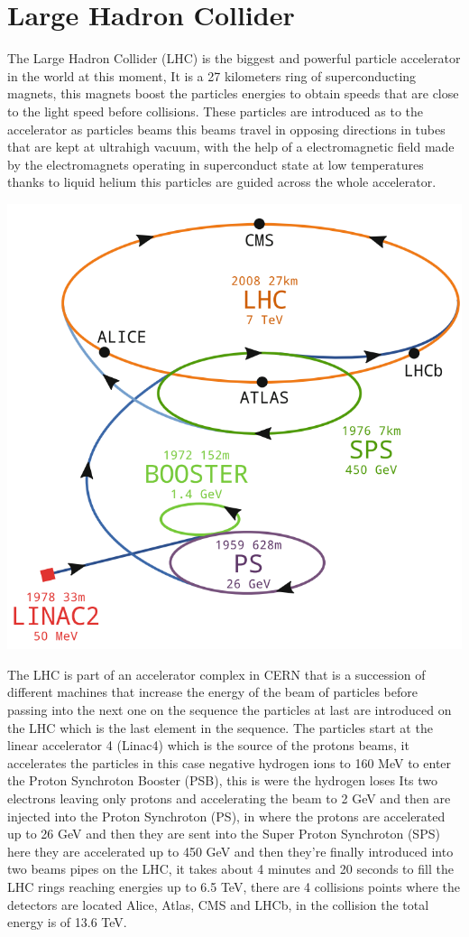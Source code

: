 \section{Large Hadron Collider}

The Large Hadron Collider (LHC) is the biggest and powerful particle accelerator in the world at this moment, It is a 27 kilometers ring of superconducting magnets, this magnets boost the particles energies to obtain speeds that are close to the light speed before collisions. These particles are introduced as to the accelerator as particles beams this beams travel in opposing directions in tubes that are kept at ultrahigh vacuum, with the help of a electromagnetic field made by the electromagnets operating in superconduct state at low temperatures thanks to liquid helium this particles are guided across the whole accelerator. \cite{LHC}


 \includegraphics[scale=0.35]{LHC.png}

The LHC is part of an accelerator complex in CERN that is a succession of different machines that increase the energy of the beam of particles before passing into the next one on the sequence the particles at last are introduced on the LHC which is the last element in the sequence. The particles start at the linear accelerator 4 (Linac4) which is the source of the protons beams, it accelerates the particles in this case negative hydrogen ions to 160 MeV to enter the Proton Synchroton Booster (PSB), this is were the hydrogen loses Its two electrons leaving only protons and accelerating the beam to 2 GeV  and then are injected into the Proton Synchroton (PS), in where the protons are accelerated up to 26 GeV and then they are sent into the Super Proton Synchroton (SPS) here they are accelerated up to 450 GeV and then they're finally introduced into two beams pipes on the LHC, it takes about 4 minutes and 20 seconds to fill the LHC rings reaching energies up to 6.5 TeV, there are 4 collisions points where the detectors are located Alice, Atlas, CMS and LHCb, in the collision the total energy is of 13.6 TeV. \cite{LHCII}

